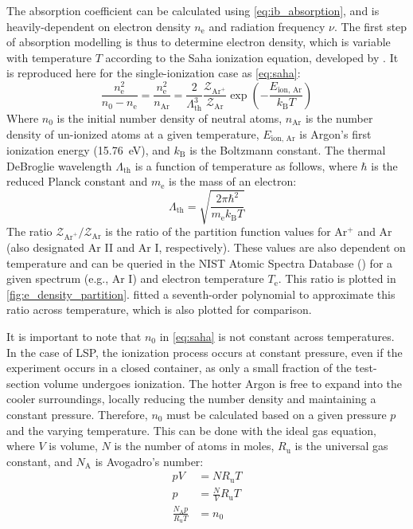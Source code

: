         The absorption coefficient can be calculated using \autoref{eq:ib_absorption}, and is heavily-dependent on electron density $n_\mathrm{e}$ and radiation frequency $\nu$. The first step of absorption modelling is thus to determine electron density, which is variable with temperature $T$ according to the Saha ionization equation, developed by \textcite{sahaPhysicalTheoryStellar1997}. It is reproduced here for the single-ionization case as \autoref{eq:saha}:
        \begin{equation}
            \frac{n_\mathrm{e}^2}{n_0-n_\mathrm{e}} = \frac{n_\mathrm{e}^2}{n_\mathrm{Ar}} = \frac{2}{\Lambda_\mathrm{th}^3}\frac{\mathcal{Z}_{\mathrm{Ar}^+}}{\mathcal{Z}_\mathrm{Ar}}\exp{\left(-\frac{E_\text{ion, Ar}}{k_\mathrm{B}T}\right)}
            \label{eq:saha}
        \end{equation}
        Where $n_0$ is the initial number density of neutral atoms, $n_\mathrm{Ar}$ is the number density of un-ionized atoms at a given temperature, $E_\text{ion, Ar}$ is Argon's first ionization energy (\qty{15.76}{eV}), and $k_\mathrm{B}$ is the Boltzmann constant. The thermal DeBroglie wavelength $\Lambda_\mathrm{th}$ is a function of temperature as follows, where $\hbar$ is the reduced Planck constant and $m_\mathrm{e}$ is the mass of an electron:
        \begin{equation*}
            \Lambda_\mathrm{th} = \sqrt{\frac{2\pi \hbar^2}{m_\mathrm{e}k_\mathrm{B}T}}
        \end{equation*}
        The ratio $\mathcal{Z}_{\mathrm{Ar}^+}/\mathcal{Z}_\mathrm{Ar}$ is the ratio of the partition function values for Ar$^+$ and Ar (also designated Ar II and Ar I, respectively). These values are also dependent on temperature and can be queried in the NIST Atomic Spectra Database (\textcite{kramidaNISTAtomicSpectra2022}) for a given spectrum (e.g., Ar I) and electron temperature $T_\mathrm{e}$. This ratio is plotted in \autoref{fig:e_density_partition}. \citeauthor{nassarInvestigationLasersustainedPlasma2012} fitted a seventh-order polynomial to approximate this ratio across temperature, which is also plotted for comparison.

        It is important to note that $n_0$ in \autoref{eq:saha} is not constant across temperatures. In the case of LSP, the ionization process occurs at constant pressure, even if the experiment occurs in a closed container, as only a small fraction of the test-section volume undergoes ionization. The hotter Argon is free to expand into the cooler surroundings, locally reducing the number density and maintaining a constant pressure. Therefore, $n_0$ must be calculated based on a given pressure $p$ and the varying temperature. This can be done with the ideal gas equation, where $V$ is volume, $N$ is the number of atoms in moles, $R_\mathrm{u}$ is the universal gas constant, and $N_\mathrm{A}$ is Avogadro's number:
        \begin{align*}
            pV&= NR_\mathrm{u}T \\
            p&= \frac{N}{V}R_\mathrm{u}T \\
            \frac{N_\mathrm{A}p}{R_\mathrm{u}T}&= n_0
        \end{align*}

